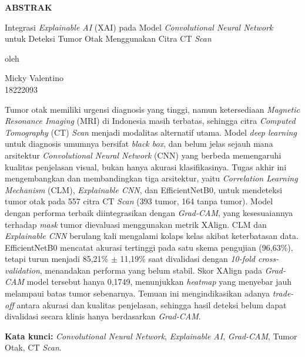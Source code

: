 \begin{center}
	\textbf{ABSTRAK}
\end{center}

\begin{center}
	Integrasi \textit{Explainable AI} (XAI) pada Model \textit{Convolutional Neural Network}\\
	untuk Deteksi Tumor Otak Menggunakan Citra CT \textit{Scan}
	
	\vspace{0.3cm}
	oleh
	
	\vspace{0.3cm}
	Micky Valentino\\
	18222093
\end{center}

\vspace{0.5cm}

Tumor otak memiliki urgensi diagnosis yang tinggi, namun ketersediaan \textit{Magnetic Resonance Imaging} (MRI) di Indonesia masih terbatas, sehingga citra \textit{Computed Tomography} (CT) \textit{Scan} menjadi modalitas alternatif utama. Model \textit{deep learning} untuk diagnosis umumnya bersifat \textit{black box}, dan belum jelas sejauh mana arsitektur \textit{Convolutional Neural Network} (CNN) yang berbeda memengaruhi kualitas penjelasan visual, bukan hanya akurasi klasifikasinya. Tugas akhir ini mengembangkan dan membandingkan tiga arsitektur, yaitu \textit{Correlation Learning Mechanism} (CLM), \textit{Explainable CNN}, dan EfficientNetB0, untuk mendeteksi tumor otak pada 557 citra CT \textit{Scan} (393 tumor, 164 tanpa tumor). Model dengan performa terbaik diintegrasikan dengan \textit{Grad-CAM}, yang kesesuaiannya terhadap \textit{mask} tumor dievaluasi menggunakan metrik XAlign. CLM dan \textit{Explainable CNN} berulang kali mengalami kolaps kelas akibat keterbatasan data. EfficientNetB0 mencatat akurasi tertinggi pada satu skema pengujian (96,63\%), tetapi turun menjadi 85,21\% $\pm$ 11,19\% saat divalidasi dengan \textit{10-fold cross-validation}, menandakan performa yang belum stabil. Skor XAlign pada \textit{Grad-CAM} model tersebut hanya 0,1749, menunjukkan \textit{heatmap} yang menyebar jauh melampaui batas tumor sebenarnya. Temuan ini mengindikasikan adanya \textit{trade-off} antara akurasi dan kualitas penjelasan, sehingga hasil deteksi belum dapat divalidasi secara klinis hanya berdasarkan \textit{Grad-CAM}.

\vspace{0.5cm}
\noindent\textbf{Kata kunci:} \textit{Convolutional Neural Network}, \textit{Explainable AI}, \textit{Grad-CAM}, Tumor Otak, CT \textit{Scan}.